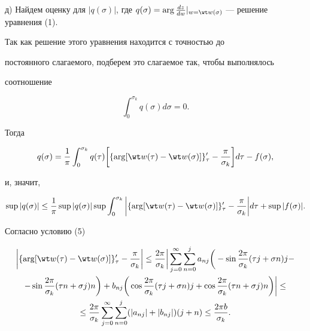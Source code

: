 д) Найдем оценку для $|q(\sigma)|$, где $q(\sigma) = \arg


\frac{dz}{dw}|_{w = \wt w(\sigma)}$ --- решение уравнения (1).


Так как решение этого уравнения находится с точностью до


постоянного слагаемого, подберем это слагаемое так, чтобы выполнялось


соотношение


$$


\int_0^{\sigma_k} q(\sigma) d\sigma = 0.


$$


Тогда


$$


q(\sigma) = \frac{1}{\pi} \int_0^{\sigma_k} q(\tau) \bigg[\{\arg[\wt w(\tau)


- \wt w(\sigma)]\}'_{\tau} - \frac{\pi}{\sigma_k}\bigg]d\tau - f(\sigma),


$$


и, значит,


\begin{equation}


\sup |q(\sigma)| \leq \frac{1}{\pi} \sup |q(\sigma)| \sup \int_0^{\sigma_k}


\bigg|\{\arg[\wt w(\tau) - \wt w(\sigma)]\}'_{\tau} - \frac{\pi}{\sigma_k}


\bigg|d\tau +\sup|f(\sigma)|.


\end{equation}


Согласно условию (5)


\begin{multline*}


\bigg|\{\arg [\wt w(\tau) - \wt w(\sigma)]\}'_{\tau} - \frac{\pi}{\sigma_k}


\bigg|\leq \frac{2 \pi}{\sigma_k}


\bigg|\sum_{j = 0}^{\infty}\sum_{n = 0}^j


a_{nj}\bigg(-\sin\frac{2\pi}{\sigma_k} (\tau j + \sigma n) j - \\


%


- \sin \frac{2\pi}{\sigma_k}(\tau n + \sigma j) n\bigg) +


b_{nj} \bigg(\cos \frac{2\pi}{\sigma_k} (\tau j + \sigma n) j +


\cos \frac{2 \pi}{\sigma_k} (\tau n + \sigma j) n\bigg)\bigg| \leq \\


%


\leq \frac{2\pi}{\sigma_k} \sum_{j = 0}^{\infty} \sum_{n = 0}^j


(|a_{nj}| + |b_{nj}|)(j + n) \leq \frac{2\pi b}{\sigma_k}.


\end{multline*}


